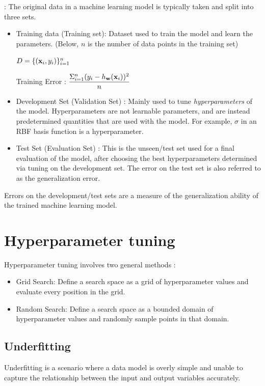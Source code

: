 \begin{mdframed}
   :
  The original data in a machine learning model is typically taken and split into three sets.
  \begin{itemize}
    \item Training data (Training set): Dataset used to train the model and learn the parameters. (Below, $n$ is the number of data points in the training set)
          \begin{center}$D = \{(\mathbf{x}_i, y_i)\}_{i=1}^n$\end{center}
          \begin{center}Training Error : $\dfrac{\Sigma_{i=1}^n (y_i - h_{\mathbf{w}}(\mathbf{x}_i))^2}{n}$\end{center}
    \item Development Set (Validation Set) : Mainly used to tune \textit{hyperparameters} of the model. Hyperparameters are not learnable parameters, and are instead predetermined quantities that are used with the model. For example, $\sigma$ in an RBF basis function is a hyperparameter.
    \item Test Set (Evaluation Set) : This is the unseen/test set used for a final evaluation of the model, after choosing the best hyperparameters determined via tuning on the development set. The error on the test set is also referred to as the generalization error.
  \end{itemize}
  Errors on the development/test sets are a measure of the generalization ability of the trained machine learning model.
\end{mdframed}

\section{Hyperparameter tuning}

Hyperparameter tuning involves two general methods :
\begin{itemize}
  \item Grid Search: Define a search space as a grid of hyperparameter values and evaluate every position in the grid.
  \item Random Search: Define a search space as a bounded domain of hyperparameter values and randomly sample points in that domain.
\end{itemize}

\subsection{Underfitting}
Underfitting is a scenario where a data model is overly simple and unable to capture the relationship between the input and output variables accurately.

